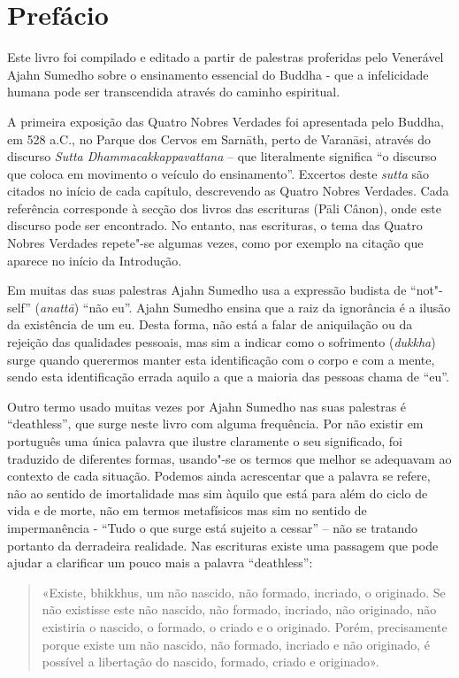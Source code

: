 \chapter{Prefácio}

Este livro foi compilado e editado a partir de palestras proferidas pelo
Venerável Ajahn Sumedho sobre o ensinamento essencial do Buddha - que a
infelicidade humana pode ser transcendida através do caminho espiritual.

A primeira exposição das Quatro Nobres Verdades foi apresentada pelo Buddha, em
528 a.C., no Parque dos Cervos em Sarnāth, perto de Varanāsi, através do
discurso \emph{Sutta Dhammacakkappavattana} – que literalmente
significa “o discurso que coloca em movimento o veículo do ensinamento”.
Excertos deste \emph{sutta} são citados no início de cada capítulo, descrevendo
as Quatro Nobres Verdades. Cada referência corresponde à secção dos livros das
escrituras (Pāli Cânon), onde este discurso pode ser encontrado. No entanto, nas
escrituras, o tema das Quatro Nobres Verdades repete"-se algumas vezes, como por
exemplo na citação que aparece no início da Introdução.

Em muitas das suas palestras Ajahn Sumedho usa a expressão budista de “not"-self”
(\emph{anattā}) “não eu”. Ajahn Sumedho ensina que a raiz da ignorância é a
ilusão da existência de um eu. Desta forma, não está a falar de aniquilação ou
da rejeição das qualidades pessoais, mas sim a indicar como o sofrimento
(\emph{dukkha}) surge quando querermos manter esta identificação com o corpo e
com a mente, sendo esta identificação errada aquilo a que a maioria das
pessoas chama de “eu”.

Outro termo usado muitas vezes por Ajahn Sumedho nas suas palestras é
“deathless”, que surge neste livro com alguma frequência. Por não existir em
português uma única palavra que ilustre claramente o seu significado, foi
traduzido de diferentes formas, usando"-se os termos que melhor se adequavam ao
contexto de cada situação. Podemos ainda acrescentar que a palavra se refere,
não ao sentido de imortalidade mas sim àquilo que está para além do ciclo de
vida e de morte, não em termos metafísicos mas sim no sentido de impermanência -
“Tudo o que surge está sujeito a cessar” – não se tratando portanto da
derradeira realidade. Nas escrituras existe uma passagem que pode ajudar a
clarificar um pouco mais a palavra “deathless”:

\begin{quote}
  «Existe, bhikkhus, um não nascido, não formado, incriado, o originado. 
  Se não existisse este não nascido, não formado, incriado, não
  originado, não existiria o nascido, o formado, o criado e o originado. Porém,
  precisamente porque existe um não nascido, não formado, incriado e não
  originado, é possível a libertação do nascido, formado, criado e originado».

\end{quote}

